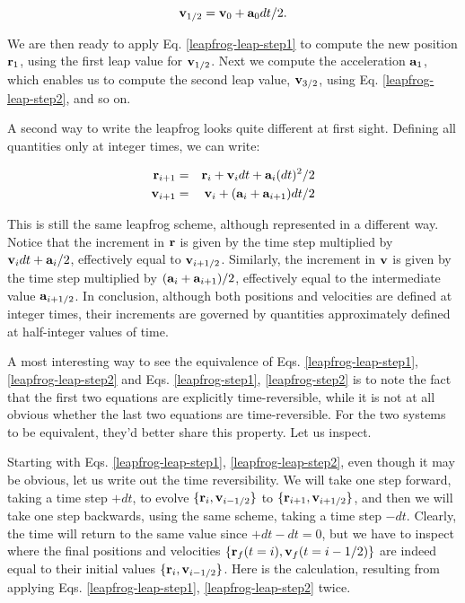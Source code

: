 \begin{equation}
{\bf v}_{1/2} = {\bf v}_0 + {\bf a}_0 dt / 2.
\end{equation}

We are then ready to apply Eq. \ref{leapfrog-leap-step1} to compute
the new position ${\bf r}_1$, using the first leap value for ${\bf v}_{1/2}$.
Next we compute the acceleration ${\bf a}_1$, which enables us to compute
the second leap value, ${\bf v}_{3/2}$, using Eq. \ref{leapfrog-leap-step2},
and so on.

A second way to write the leapfrog looks quite different at first sight.
Defining all quantities only at integer times, we can write:

\begin{eqnarray}
\br_{i+1} & = & \br_i + \bv_{i} dt + \ba_{i} (dt)^2/2 \label{leapfrog-step1} \\
\bv_{i+1} & = & \bv_i + (\ba_i + \ba_{i+1})dt / 2 \label{leapfrog-step2}
\end{eqnarray}

This is still the same leapfrog scheme, although represented in a
different way.  Notice that the increment in ${\bf r}$ is given by the
time step multiplied by ${\bf v}_{i} dt + {\bf a}_{i} / 2$, effectively equal
to ${\bf v}_{i+ 1/2}$.  Similarly, the increment in ${\bf v}$ is given by the
time step multiplied by $({\bf a}_i + {\bf a}_{i+1}) / 2$, effectively equal
to the intermediate value ${\bf a}_{i+1/2}$.  In conclusion, although both
positions and velocities are defined at integer times, their
increments are governed by quantities approximately defined at
half-integer values of time.

A most interesting way to see the equivalence of
Eqs. \ref{leapfrog-leap-step1}, \ref{leapfrog-leap-step2} and 
Eqs. \ref{leapfrog-step1}, \ref{leapfrog-step2} is to note the fact
that the first two equations are explicitly time-reversible, while it
is not at all obvious whether the last two equations are time-reversible.
For the two systems to be equivalent, they'd better share this property.
Let us inspect.

Starting with Eqs. \ref{leapfrog-leap-step1}, \ref{leapfrog-leap-step2},
even though it may be obvious, let us write out the time reversibility.
We will take one step forward, taking a time step $+dt$, to evolve
$\{{\bf r}_i, {\bf v}_{i-1/2}\}$ to $\{{\bf r}_{i+1}, {\bf v}_{i+1/2}\}$, and then we
will take one step backwards, using the same scheme, taking a time
step $-dt$.  Clearly, the time will return to the same value since
$+dt-dt=0$, but we have to inspect where the final positions and
velocities $\{{\bf r}_f(t=i), {\bf v}_f(t=i-1/2)\}$ are indeed equal to their
initial values $\{{\bf r}_i, {\bf v}_{i-1/2}\}$.  Here is the calculation, resulting
from applying Eqs. \ref{leapfrog-leap-step1}, \ref{leapfrog-leap-step2} twice.

